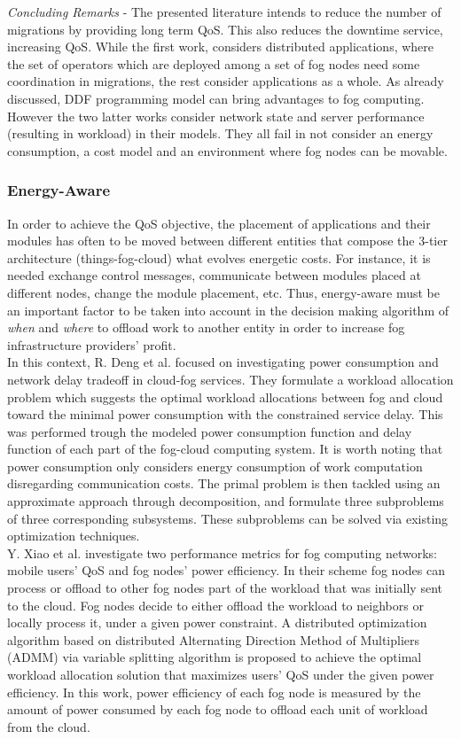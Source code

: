 \textit{Concluding Remarks} - The presented literature intends to reduce the number of migrations by providing long term QoS. This also reduces the downtime service, increasing QoS. While the first work, considers distributed applications, where the set of operators which are deployed among a set of fog nodes need some coordination in migrations, the rest consider applications as a whole. As already discussed, DDF programming model can bring advantages to fog computing. However the two latter works consider network state and server performance (resulting in workload) in their models. They all fail in not consider an energy consumption, a cost model and an environment where fog nodes can be movable.

\subsubsection{Energy-Aware}\label{EnergyAware}
\noindent In order to achieve the QoS objective, the placement of applications and their modules has often to be moved between different entities that compose the 3-tier architecture (things-fog-cloud) what evolves energetic costs. For instance, it is needed exchange control messages, communicate between modules placed at different nodes, change the module placement, etc. Thus, energy-aware must be an important factor to be taken into account in the decision making algorithm of \textit{when} and \textit{where} to offload work to another entity in order to increase fog infrastructure providers' profit.\\
\noindent\tab In this context, R. Deng et al. \cite{deng2016optimal} focused on investigating power consumption and network delay tradeoff in cloud-fog services. They formulate a workload allocation problem which suggests the optimal workload allocations between fog and cloud toward the minimal power consumption with the constrained service delay. This was performed trough the modeled power consumption function and delay function of each part of the fog-cloud computing system. It is worth noting that power consumption only considers energy consumption of work computation disregarding communication costs. The primal problem is then tackled using an approximate approach through decomposition, and formulate three subproblems of three corresponding subsystems. These subproblems can be solved via existing optimization techniques. \\
\noindent\tab Y. Xiao et al. \cite{xiao2017qoe} investigate two performance metrics for fog computing networks: mobile users’ QoS and fog nodes’ power efficiency. In their scheme fog nodes can process or offload to other fog nodes part of the workload that was initially sent to the cloud. Fog nodes decide to either offload the workload to neighbors or locally process it, under a given power constraint. A distributed optimization algorithm based on distributed Alternating Direction Method of Multipliers (ADMM) via variable splitting algorithm is proposed to achieve the optimal workload allocation solution that maximizes users’ QoS under the given power efficiency. In this work, power efficiency of each fog node is measured by the amount of power consumed by each fog node to offload each unit of workload from the cloud.\\
